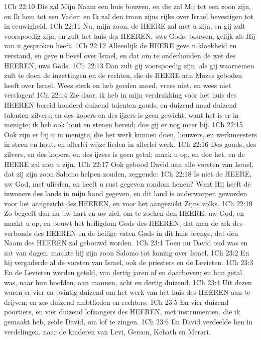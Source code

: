 1Ch 22:10  Die zal Mijn Naam een huis bouwen, en die zal Mij tot een zoon zijn, en Ik hem tot een Vader; en Ik zal den troon zijns rijks over Israel bevestigen tot in eeuwigheid.
1Ch 22:11  Nu, mijn zoon, de HEERE zal met u zijn, en gij zult voorspoedig zijn, en zult het huis des HEEREN, uws Gods, bouwen, gelijk als Hij van u gesproken heeft.
1Ch 22:12  Alleenlijk de HEERE geve u kloekheid en verstand, en geve u bevel over Israel, en dat om te onderhouden de wet des HEEREN, uws Gods.
1Ch 22:13  Dan zult gij voorspoedig zijn, als gij waarnemen zult te doen de inzettingen en de rechten, die de HEERE aan Mozes geboden heeft over Israel. Wees sterk en heb goeden moed, vrees niet, en wees niet verslagen!
1Ch 22:14  Zie daar, ik heb in mijn verdrukking voor het huis des HEEREN bereid honderd duizend talenten gouds, en duizend maal duizend talenten zilvers; en des kopers en des ijzers is geen gewicht, want het is er in menigte; ik heb ook hout en stenen bereid; doe gij er nog meer bij.
1Ch 22:15  Ook zijn er bij u in menigte, die het werk kunnen doen, houwers, en werkmeesters in steen en hout, en allerlei wijze lieden in allerlei werk.
1Ch 22:16  Des gouds, des zilvers, en des kopers, en des ijzers is geen getal; maak u op, en doe het, en de HEERE zal met u zijn.
1Ch 22:17  Ook gebood David aan alle vorsten van Israel, dat zij zijn zoon Salomo helpen zouden, zeggende:
1Ch 22:18  Is niet de HEERE, uw God, met ulieden, en heeft u rust gegeven rondom henen? Want Hij heeft de inwoners des lands in mijn hand gegeven, en dit land is onderworpen geworden voor het aangezicht des HEEREN, en voor het aangezicht Zijns volks.
1Ch 22:19  Zo begeeft dan nu uw hart en uw ziel, om te zoeken den HEERE, uw God, en maakt u op, en bouwt het heiligdom Gods des HEEREN; dat men de ark des verbonds des HEEREN en de heilige vaten Gods in dit huis brenge, dat den Naam des HEEREN zal gebouwd worden.
1Ch 23:1  Toen nu David oud was en zat van dagen, maakte hij zijn zoon Salomo tot koning over Israel.
1Ch 23:2  En hij vergaderde al de vorsten van Israel, ook de priesters en de Levieten.
1Ch 23:3  En de Levieten werden geteld, van dertig jaren af en daarboven; en hun getal was, naar hun hoofden, aan mannen, acht en dertig duizend.
1Ch 23:4  Uit dezen waren er vier en twintig duizend om het werk van het huis des HEEREN aan te drijven; en zes duizend ambtlieden en rechters;
1Ch 23:5  En vier duizend poortiers, en vier duizend lofzangers des HEEREN, met instrumenten, die ik gemaakt heb, zeide David, om lof te zingen.
1Ch 23:6  En David verdeelde hen in verdelingen, naar de kinderen van Levi, Gerson, Kehath en Merari.
